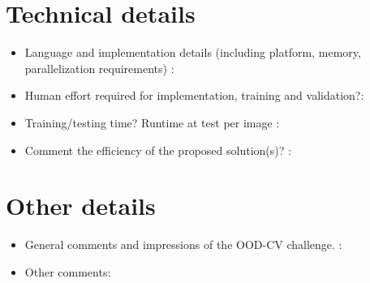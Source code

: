 \documentclass[12pt]{article}
\begin{document}
\section{Technical details}
\begin{itemize}
\item Language and implementation details (including platform, memory, parallelization requirements) :\\ 

\item Human effort required for implementation, training and validation?: \\

\item Training/testing time? Runtime at test per image : \\

\item Comment the efficiency of the proposed solution(s)? :\\

\end{itemize}

\section{Other details}
\begin{itemize}

\item General comments and impressions of the OOD-CV challenge. : \\

\item Other comments: 
\end{itemize}
\end{document}

